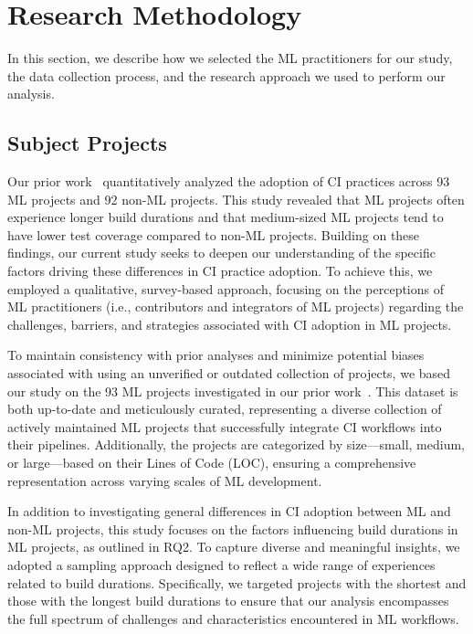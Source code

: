 
\section{Research Methodology}
\label{sec:methodology}

In this section, we describe how we selected the ML practitioners for our study, the data collection process, and the research approach we used to perform our analysis.

\subsection{Subject Projects}

Our prior work~\citep{bernardo2024machine} quantitatively analyzed the adoption of CI practices across 93 ML projects and 92 non-ML projects. This study revealed that ML projects often experience longer build durations and that medium-sized ML projects tend to have lower test coverage compared to non-ML projects. Building on these findings, our current study seeks to deepen our understanding of the specific factors driving these differences in CI practice adoption. To achieve this, we employed a qualitative, survey-based approach, focusing on the perceptions of ML practitioners (i.e., contributors and integrators of ML projects) regarding the challenges, barriers, and strategies associated with CI adoption in ML projects.

To maintain consistency with prior analyses and minimize potential biases associated with using an unverified or outdated collection of projects, we based our study on the 
93 ML projects investigated in our prior work~\citep{bernardo2024machine}. 
This dataset is both up-to-date and meticulously curated, representing a diverse collection of actively maintained ML projects that successfully integrate CI workflows into their pipelines. Additionally, the projects are categorized by size—small, medium, or large—based on their Lines of Code (LOC), ensuring a comprehensive representation across varying scales of ML development.

In addition to investigating general differences in CI adoption between ML and non-ML projects, this study focuses on the factors influencing build durations in ML projects, as outlined in RQ2. 
To capture diverse and meaningful insights, we adopted a sampling approach designed to reflect a wide range of experiences related to build durations. Specifically, we targeted projects with the shortest and those with the longest build durations to ensure that our analysis encompasses the full spectrum of challenges and characteristics encountered in ML workflows.

